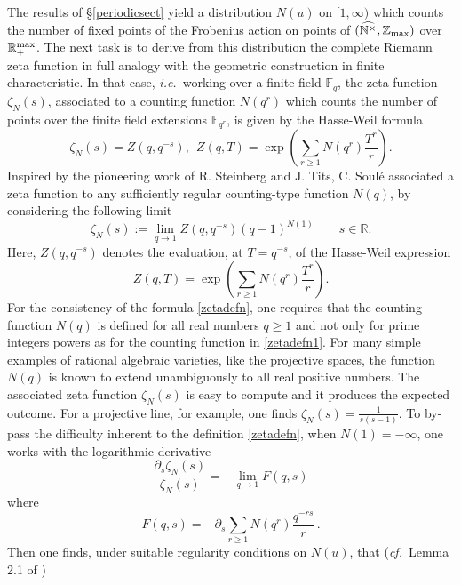 \documentclass[noams,lp]{compositio}
\def\F{{\mathbb F}}
\def\N{{\mathbb N}}
\def\R{{\mathbb R}}
\def\Z{{\mathbb Z}}
\newcommand{\ie}{{\it i.e.\/}\ }
\newcommand{\cf}{{\it cf.}}
\def\zmax{{\Z_{\rm max}}}
\def\rmax{\R_+^{\rm max}}
\def\arith{{(\wnt,\bar \N)}}
\def\wnt{{\widehat{\N^{\times}}}}
\def\arith{{(\wnt,\zmax)}}
\begin{document}
The results of \S \ref{periodicsect} yield a distribution $N(u)$ on $[1,\infty)$ which counts the number of fixed points of the Frobenius action on points of $\arith$ over $\rmax$. The next task is to derive from this distribution the complete Riemann zeta function in full analogy with the geometric construction in finite characteristic. In that case, \ie  working over a finite field $\F_q$, the zeta function $\zeta_N(s)$, associated to a counting function $N(q^r)$ which counts the number of points over the finite field extensions $\F_{q^r}$, is given by the Hasse-Weil formula
\begin{equation}\label{zetadefn1}
 \zeta_N(s)=Z(q,q^{-s}), \  \  Z(q,T) = \exp\left(\sum_{r\ge 1}N(q^r)\frac{T^r}{r}\right) .
\end{equation}
Inspired by  the pioneering work of  R. Steinberg and J. Tits, C. Soul\'e  associated  a zeta function to any sufficiently regular counting-type function $N(q)$, by considering the following limit
\begin{equation}\label{zetadefn}
\zeta_N(s):=\lim_{q\to 1}Z(q,q^{-s}) (q-1)^{N(1)}\qquad s\in\R.
\end{equation}
Here,  $Z(q,q^{-s})$ denotes the evaluation, at $T=q^{-s}$,  of the  Hasse-Weil expression
\begin{equation}\label{zetadefn1}
Z(q,T) = \exp\left(\sum_{r\ge 1}N(q^r)\frac{T^r}{r}\right).
\end{equation}
For the consistency of the formula \eqref{zetadefn}, one requires that the counting function $N(q)$ is defined for all real numbers
 $q \geq 1$ and not only for prime integers powers as for the counting function in \eqref{zetadefn1}.  For many simple examples of rational algebraic varieties, like the projective spaces, the function  $N(q)$ is known to extend unambiguously  to all real positive numbers. The associated zeta function $\zeta_N(s)$ is easy to compute and it produces the expected outcome. For a projective line, for example, one finds  $\zeta_N(s) = \frac{1}{s(s-1)}$.
To by-pass the difficulty inherent to the definition \eqref{zetadefn}, when $N(1)=-\infty$,  one works  with the logarithmic derivative
\begin{equation}\label{normael}
    \frac{\partial_s\zeta_N(s)}{\zeta_N(s)}=-\lim_{q\to 1} F(q,s)
\end{equation}
where
\begin{equation}\label{fqsdefn}
F(q,s)=-\partial_s \sum_{r\ge 1}N(q^r)\frac{q^{-rs}}{r}\,.
\end{equation}
Then one finds, under suitable regularity conditions on $N(u)$, that (\cf~Lemma 2.1 of \cite{CC1})
\end{document}
